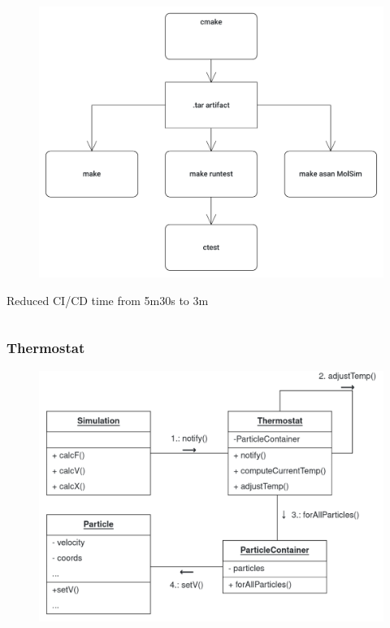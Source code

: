 \begin{frame}
\begin{columns}
		\begin{column}{0.7\textwidth}
			\vspace{-1.5cm}
			\begin{figure}
				\centering
				\includegraphics[width=0.8\linewidth]{cicd_new}
				\label{fig:cicdnew}
			\end{figure}
		\hspace{4cm}
		Reduced CI/CD time from 5m30s to 3m
			
		\end{column}
		
	\end{columns}
\end{frame}

\begin{frame}
	\frametitle{Thermostat}
	\begin{figure}
		\centering
		\includegraphics[width=0.55\linewidth]{ThermoComm}
		\label{fig:thermocomm}
	\end{figure}
	
	
\end{frame}

